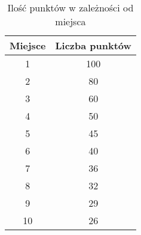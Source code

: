 \begin{table}[h!]
    \centering
    \begin{tabular}{|c|c|}
    \hline
    \textbf{Miejsce} & \textbf{Liczba punktów} \\ \hline
    1                & 100                     \\ \hline
    2                & 80                      \\ \hline
    3                & 60                      \\ \hline
    4                & 50                      \\ \hline
    5                & 45                      \\ \hline
    6                & 40                      \\ \hline
    7                & 36                      \\ \hline
    8                & 32                      \\ \hline
    9                & 29                      \\ \hline
    10               & 26                      \\ \hline
    \end{tabular}
    \caption{Ilość punktów w zależności od miejsca}
    \label{table:punkty}
\end{table}